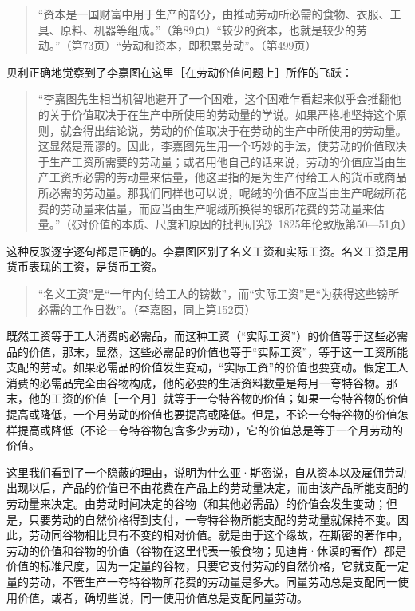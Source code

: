 \begin{quote}{“资本是一国财富中用于生产的部分，由推动劳动所必需的食物、衣服、工具、原料、机器等组成。”（第89页）“较少的资本，也就是较少的劳动。”（第73页）“劳动和资本，即积累劳动”。（第499页）}\end{quote}

贝利正确地觉察到了李嘉图在这里［在劳动价值问题上］所作的飞跃：

\begin{quote}{“李嘉图先生相当机智地避开了一个困难，这个困难乍看起来似乎会推翻他的关于价值取决于在生产中所使用的劳动量的学说。如果严格地坚持这个原则，就会得出结论说，劳动的价值取决于在劳动的生产中所使用的劳动量。这显然是荒谬的。因此，李嘉图先生用一个巧妙的手法，使劳动的价值取决于生产工资所需要的劳动量；或者用他自己的话来说，劳动的价值应当由生产工资所必需的劳动量来估量，他这里指的是为生产付给工人的货币或商品所必需的劳动量。那我们同样也可以说，呢绒的价值不应当由生产呢绒所花费的劳动量来估量，而应当由生产呢绒所换得的银所花费的劳动量来估量。”（《对价值的本质、尺度和原因的批判研究》1825年伦敦版第50—51页）}\end{quote}

这种反驳逐字逐句都是正确的。李嘉图区别了名义工资和实际工资。名义工资是用货币表现的工资，是货币工资。

\begin{quote}{“名义工资”是“一年内付给工人的镑数”，而“实际工资”是“为获得这些镑所必需的工作日数”。（李嘉图，同上第152页）}\end{quote}

既然工资等于工人消费的必需品，而这种工资（“实际工资”）的价值等于这些必需品的价值，那末，显然，这些必需品的价值也等于“实际工资”，等于这一工资所能支配的劳动。如果必需品的价值发生变动，“实际工资”的价值也要变动。假定工人消费的必需品完全由谷物构成，他的必要的生活资料数量是每月一夸特谷物。那末，他的工资的价值［一个月］就等于一夸特谷物的价值；如果一夸特谷物的价值提高或降低，一个月劳动的价值也要提高或降低。但是，不论一夸特谷物的价值怎样提高或降低（不论一夸特谷物包含多少劳动），它的价值总是等于一个月劳动的价值。

这里我们看到了一个隐蔽的理由，说明为什么亚·斯密说，自从资本以及雇佣劳动出现以后，产品的价值已不由花费在产品上的劳动量决定，而由该产品所能支配的劳动量来决定。由劳动时间决定的谷物（和其他必需品）的价值会发生变动；但是，只要劳动的自然价格得到支付，一夸特谷物所能支配的劳动量就保持不变。因此，劳动同谷物相比具有不变的相对价值。就是由于这个缘故，在斯密的著作中，劳动的价值和谷物的价值（谷物在这里代表一般食物；见迪肯·休谟的著作）都是价值的标准尺度，因为一定量的谷物，只要它支付劳动的自然价格，它就支配一定量的劳动，不管生产一夸特谷物所花费的劳动量是多大。同量劳动总是支配同一使用价值，或者，确切些说，同一使用价值总是支配同量劳动。

